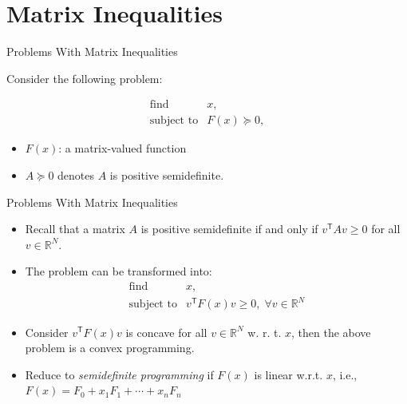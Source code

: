\documentclass[
  ignorenonframetext,
  aspectratio=169,
  serif,onlymath]{beamer}
\providecommand{\tightlist}{%
  \setlength{\itemsep}{0pt}\setlength{\parskip}{0pt}}
\begin{document}
\hypertarget{matrix-inequalities}{%
\section{Matrix Inequalities}\label{matrix-inequalities}}

\begin{frame}{Problems With Matrix Inequalities}
\protect\hypertarget{problems-with-matrix-inequalities}{}

Consider the following problem:

\[\begin{array}{ll}
    \text{find}    & x, \\
    \text{subject to}  & F(x) \succeq 0,
\end{array}\]

\begin{itemize}
\tightlist
\item
  \(F(x)\): a matrix-valued function
\item
  \(A \succeq 0\) denotes \(A\) is positive semidefinite.
\end{itemize}

\end{frame}

\begin{frame}{Problems With Matrix Inequalities}
\protect\hypertarget{problems-with-matrix-inequalities-1}{}

\begin{itemize}
\tightlist
\item
  Recall that a matrix \(A\) is positive semidefinite if and only if
  \(v^\mathsf{T} A v \ge 0\) for all \(v \in \mathbb{R}^N\).
\item
  The problem can be transformed into: \[\begin{array}{ll}
            \text{find}      & x, \\
            \text{subject to}    & v^\mathsf{T} F(x) v \ge 0, \; \forall v \in \mathbb{R}^N
    \end{array}\]
\item
  Consider \(v^\mathsf{T} F(x) v\) is concave for all
  \(v \in \mathbb{R}^N\) w. r. t. \(x\), then the above problem is a
  convex programming.
\item
  Reduce to \emph{semidefinite programming} if \(F(x)\) is linear w.r.t.
  \(x\), i.e., \(F(x) = F_0 + x_1 F_1 + \cdots + x_n F_n\)
\end{itemize}

\end{frame}
\end{document}

